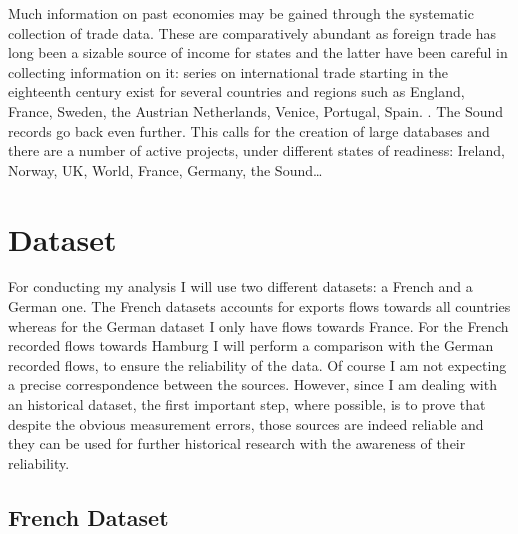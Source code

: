 \documentclass[12pt,a4paper,titlepage,english]{article}
\begin{document}
Much information on past economies may be gained through the systematic collection of trade data.
These are comparatively abundant as foreign trade has long been a sizable source of income for states and the latter have been careful in collecting information on it: series on international trade starting in the eighteenth century exist for several countries and regions such as England, France, Sweden, the Austrian Netherlands, Venice, Portugal, Spain. \cite{charles2015eighteenth}. The Sound records go back even further. This calls for the creation of large databases and there are a number of active projects, under different states of readiness: Ireland, Norway, UK, World, France, Germany, the Sound…



\section{Dataset}
\cite{daudin_toflit18_????}
For conducting my analysis I will use two different datasets: a French and a German one. The French datasets accounts for exports flows towards all countries whereas for the German dataset I only have flows towards France. For the French recorded flows towards Hamburg I will perform a comparison with the German recorded flows, to ensure the reliability of the data. Of course I am not expecting a precise correspondence between the sources. However, since I am dealing with an historical dataset, the first important step, where possible, is to prove that despite the obvious measurement errors, those sources are indeed reliable and they can be used for further historical research with the awareness of their reliability. 

\subsection{French Dataset}
\end{document}
